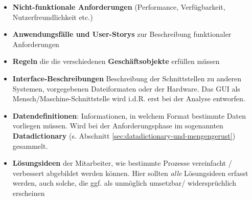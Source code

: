 \begin{itemize}
    \item \textbf{Nicht-funktionale Anforderungen} (Performance, Verfügbarkeit, Nutzerfreundlichkeit etc.)
    \item \textbf{Anwendungsfälle und User-Storys} zur Beschreibung funktionaler Anforderungen
    \item \textbf{Regeln} die die verschiedenen \textbf{Geschäftsobjekte} erfüllen müssen
    \item \textbf{Interface-Beschreibungen} Beschreibung der Schnittstellen zu anderen Systemen, vorgegebenen Dateiformaten oder der Hardware.
    Das GUI als Mensch/Maschine-Schnittstelle wird i.d.R. erst bei der Analyse entworfen.
    \item \textbf{Datendefinitionen}: Informationen, in welchem Format bestimmte Daten vorliegen müssen.
    Wird bei der Anforderungsphase im sogenannten \textbf{Datadictionary} (s. Abschnitt \ref{sec:datadictionary-und-mengengerust}) gesammelt.
    \item \textbf{Lösungsideen} der Mitarbeiter, wie bestimmte Prozesse vereinfacht / verbessert abgebildet werden können.
    Hier sollten \textit{alle} Lösungsideen erfasst werden, auch solche, die ggf. als unmöglich umsetzbar/ widersprüchlich erscheinen
\end{itemize}

